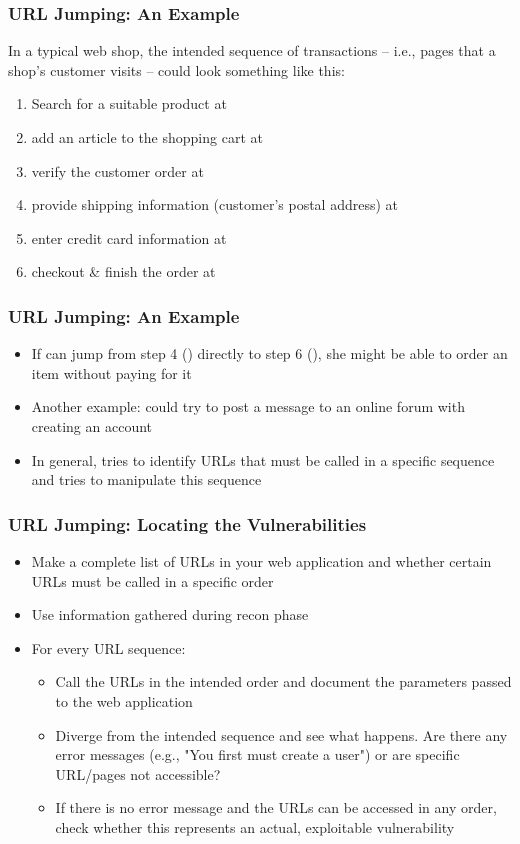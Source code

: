 \begin{frame}[fragile]
    \frametitle{URL Jumping: An Example}
    In a typical web shop, the intended sequence of transactions -- i.e., pages that a shop's customer visits -- could look something like this:
    \begin{enumerate}
        \item Search for a suitable product at 
        \item add an article to the shopping cart at 
        \item verify the customer order at 
        \item provide shipping information (customer's postal address) at 
        \item enter credit card information at 
        \item checkout \& finish the order at 
    \end{enumerate}
\end{frame}

\begin{frame}
    \frametitle{URL Jumping: An Example}
    \begin{itemize}
        \item If \attacker can jump from step 4 () directly to step 6 (), she might be able to order an item without paying for it
        \item Another example: \attacker could try to post a message to an online forum with creating an account
        \item In general, \attacker tries to identify URLs that must be called in a specific sequence and tries to manipulate this sequence 
    \end{itemize}
\end{frame}

\begin{frame}
    \frametitle{URL Jumping: Locating the Vulnerabilities}
    \begin{itemize}
        \item Make a complete list of URLs in your web application and whether certain URLs must be called in a specific order
        \item Use information gathered during recon phase
        \item For every URL sequence:
        \begin{itemize}
            \item Call the URLs in the intended order and document the parameters passed to the web application
            \item Diverge from the intended sequence and see what happens. Are there any error messages (e.g., "You first must create a user") or are specific URL/pages not accessible?
            \item If there is no error message and the URLs can be accessed in any order, check whether this represents an actual, exploitable vulnerability
        \end{itemize}
    \end{itemize}
\end{frame}

